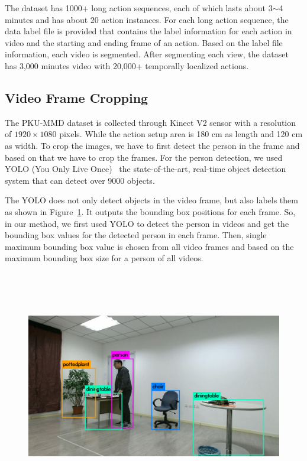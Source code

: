 The dataset has 1000+ long action sequences, each of which lasts about 3$\sim$4 minutes and has about 20 action instances. For each long action sequence, the data label file is provided that contains the label information for each action in video and the starting and ending frame of an action. Based on the label file information, each video is segmented. After segmenting each view, the dataset has 3,000 minutes video with 20,000+ temporally localized actions. 
\subsection{Video Frame Cropping}

The PKU-MMD dataset is collected through Kinect V2 sensor with a resolution of $1920\times1080$ pixels. While the action setup area is 180 \si{cm} as length and 120 \si{cm} as width. To crop the images, we have to first detect the person in the frame and based on that we have to crop the frames. For the person detection, we used YOLO (You Only Live Once)~\cite{DBLP:journals/corr/RedmonF16} the state-of-the-art, real-time object detection system that can detect over 9000 objects. 

The YOLO does not only detect objects in the video frame, but also labels them as shown in Figure~\ref{fig1:PKUMMD-Example}. It outputs the bounding box positions for each frame. So, in our method, we first used YOLO to detect the person in videos and get the bounding box values for the detected person in each frame. Then, single maximum bounding box value is chosen from all video frames and based on the maximum bounding box size for a person of all videos.
\begin{figure}[!ht]
	\centering
	\includegraphics[width=6in,height=4in]{figures/predictions}
	\linebreak
	\label{fig1:PKUMMD-Example}
\end{figure}

